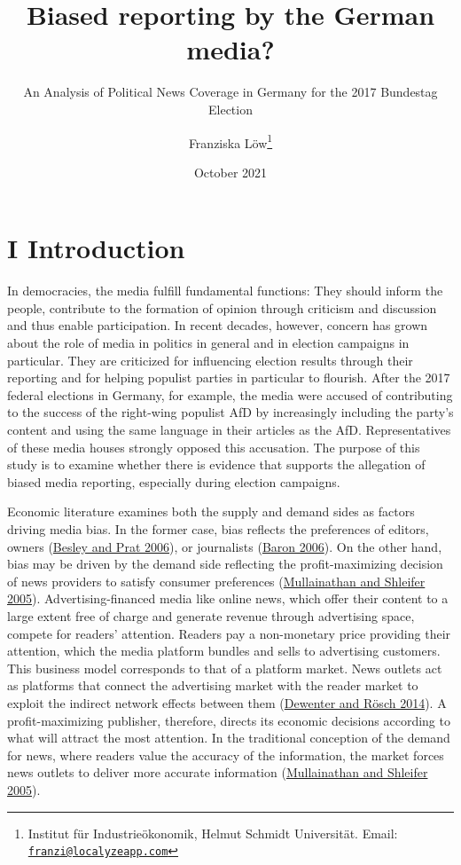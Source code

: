 \documentclass[
  12pt,
]{article}
\title{Biased reporting by the German media?}
\subtitle{An Analysis of Political News Coverage in Germany for the 2017
Bundestag Election}
\author{Franziska Löw\footnote{Institut für Industrieökonomik, Helmut
  Schmidt Universität. Email:
  \href{mailto:franzi@localyzeapp.com}{\nolinkurl{franzi@localyzeapp.com}}}}
\date{October 2021}
\begin{document}
\maketitle

\hypertarget{i-introduction}{%
\section{I Introduction}\label{i-introduction}}

In democracies, the media fulfill fundamental functions: They should
inform the people, contribute to the formation of opinion through
criticism and discussion and thus enable participation. In recent
decades, however, concern has grown about the role of media in politics
in general and in election campaigns in particular. They are criticized
for influencing election results through their reporting and for helping
populist parties in particular to flourish. After the 2017 federal
elections in Germany, for example, the media were accused of
contributing to the success of the right-wing populist AfD by
increasingly including the party's content and using the same language
in their articles as the AfD. Representatives of these media houses
strongly opposed this accusation. The purpose of this study is to
examine whether there is evidence that supports the allegation of biased
media reporting, especially during election campaigns.

Economic literature examines both the supply and demand sides as factors
driving media bias. In the former case, bias reflects the preferences of
editors, owners (\protect\hyperlink{ref-besley_handcuffs_2006}{Besley
and Prat 2006}), or journalists
(\protect\hyperlink{ref-baron_persistent_2006}{Baron 2006}). On the
other hand, bias may be driven by the demand side reflecting the
profit-maximizing decision of news providers to satisfy consumer
preferences
(\protect\hyperlink{ref-mullainathan_market_2005}{Mullainathan and
Shleifer 2005}). Advertising-financed media like online news, which
offer their content to a large extent free of charge and generate
revenue through advertising space, compete for readers' attention.
Readers pay a non-monetary price providing their attention, which the
media platform bundles and sells to advertising customers. This business
model corresponds to that of a platform market. News outlets act as
platforms that connect the advertising market with the reader market to
exploit the indirect network effects between them
(\protect\hyperlink{ref-dewenter_einfuhrung_2014}{Dewenter and Rösch
2014}). A profit-maximizing publisher, therefore, directs its economic
decisions according to what will attract the most attention. In the
traditional conception of the demand for news, where readers value the
accuracy of the information, the market forces news outlets to deliver
more accurate information
(\protect\hyperlink{ref-mullainathan_market_2005}{Mullainathan and
Shleifer 2005}).
\end{document}
